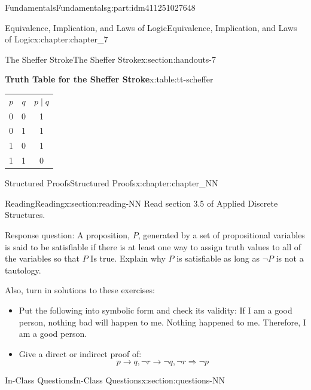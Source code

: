 \documentclass[oneside,10pt,]{book}
\newcommand{\tabularfont}{\relax}
\numberwithin{equation}{section}
\begin{document}
\begin{partptx}{Fundamentals}{}{Fundamentals}{}{}{g:part:idm411251027648}
\begin{chapterptx}{Equivalence, Implication, and Laws of Logic}{}{Equivalence, Implication, and Laws of Logic}{}{}{x:chapter:chapter_7}
\begin{sectionptx}{The Sheffer Stroke}{}{The Sheffer Stroke}{}{}{x:section:handouts-7}
\begin{tableptx}{\textbf{Truth Table for the Sheffer Stroke}}{x:table:tt-scheffer}{}%
\centering
{\tabularfont%
\begin{tabular}{ccc}
\(p\)&\(q\)&\(p \mid q\)\tabularnewline[0pt]
0&0&1\tabularnewline[0pt]
0&1&1\tabularnewline[0pt]
1&0&1\tabularnewline[0pt]
1&1&0
\end{tabular}
}%
\end{tableptx}%
\end{sectionptx}
\end{chapterptx}
%
\typeout{************************************************}
\typeout{************************************************}
%
\begin{chapterptx}{Structured Proofs}{}{Structured Proofs}{}{}{x:chapter:chapter_NN}
%
%
%
\typeout{************************************************}
\typeout{************************************************}
%
\begin{sectionptx}{Reading}{}{Reading}{}{}{x:section:reading-NN}
Read section 3.5 of Applied Discrete Structures.%
\par
Response question: A proposition, \(P\), generated by a set of propositional variables is said to be satisfiable if there is at least one way to assign truth values to all of the variables so that \(P\) Is true. Explain why \(P\) is satisfiable as long as \(\neg P\)  is not a tautology.%
\par
Also, turn in solutions to these exercises:%
\begin{itemize}[label=\textbullet]
\item{}Put the following into symbolic form and check its validity: If I am a good person, nothing bad will happen to me. Nothing happened to me. Therefore, I am a good person.%
\item{}Give  a direct or indirect proof of:%
\begin{equation*}
p\rightarrow  q, \neg r\rightarrow  \neg q, \neg r \Rightarrow  \neg p
\end{equation*}
%
\end{itemize}
%
\end{sectionptx}
%
%
\typeout{************************************************}
\typeout{************************************************}
%
\begin{sectionptx}{In-Class Questions}{}{In-Class Questions}{}{}{x:section:questions-NN}
%
\begin{enumerate}[label=\arabic*.]

\end{enumerate}
\end{sectionptx}
\end{chapterptx}
\end{partptx}
\end{document}
